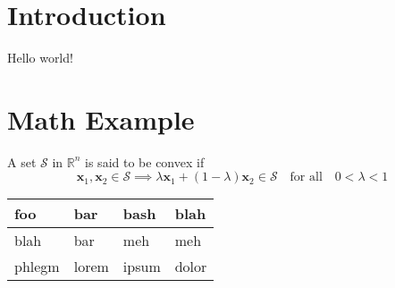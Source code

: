\documentclass{article}
\begin{document}
\section{Introduction}
Hello world!

\section{Math Example}
A set \( \mathcal{S} \) in \( \mathbb{R}^n \) is said to be convex if
\[ \mathbf{x}_1, \mathbf{x}_2 \in \mathcal{S} \implies \lambda \mathbf{x}_1 +
(1-\lambda) \mathbf{x}_2 \in \mathcal{S} \text{~~~for all~~~} 0 < \lambda < 1 \]



\vspace{2cm}

\begin{tabular}{| l | l | l | l |}
  \hline
  foo & bar & bash & blah \\
  \hline
  blah & bar & meh & meh \\
  \hline
  phlegm & lorem & ipsum & dolor \\
  \hline
\end{tabular}
\end{document}
